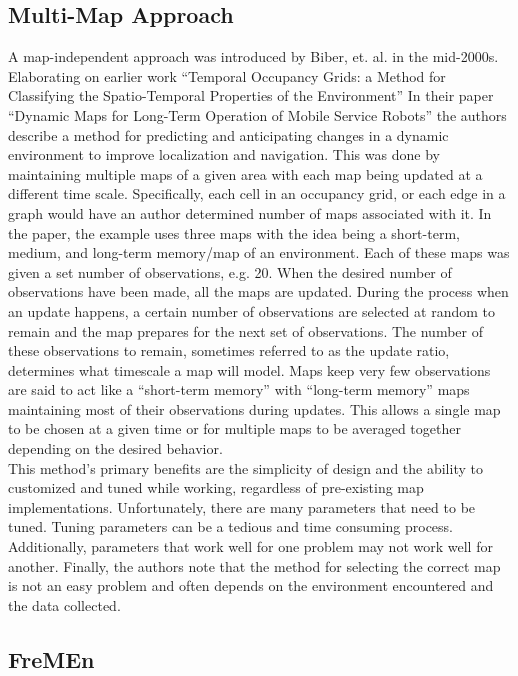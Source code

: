   \subsection{ Multi-Map Approach }
  A map-independent approach was introduced by Biber, et. al. in the mid-2000s.
  Elaborating on earlier work ``Temporal Occupancy Grids: a Method for
  Classifying the Spatio-Temporal Properties of the Environment''
  \cite{Arbuckle2002} In their paper ``Dynamic Maps for Long-Term Operation of Mobile Service Robots''
  the authors describe a method for predicting and anticipating changes in
  a dynamic environment to improve localization and navigation. This was done
  by maintaining multiple maps of a given area with each map
  being updated at a different time scale. Specifically, each cell in an occupancy
  grid, or each edge in a graph would have an author determined number of maps
  associated with it. In the paper, the example uses three maps with the
  idea being a short-term, medium, and long-term memory/map of an environment.
  Each of these maps was given a set number of observations, e.g. 20. When
  the desired number of observations have been made, all the maps are updated. During the process when
  an update happens, a certain number of observations are selected at random to
  remain and the map prepares for the next set of observations. The number of these
  observations to remain, sometimes referred to as the update ratio, determines
  what timescale a map will model. Maps keep very few observations are said to
  act like a ``short-term memory'' with ``long-term memory'' maps maintaining most of
  their observations during updates. This allows a single map to be chosen at a given
  time or for multiple maps to be averaged together depending on the desired behavior. \\

  This method's primary benefits are the simplicity of design and the ability to
  customized and tuned while working, regardless of pre-existing map
  implementations. Unfortunately, there are many parameters that need
  to be tuned. Tuning parameters can be a tedious and time consuming process.
  Additionally, parameters that work well for one problem may not work well for
  another. Finally, the authors note that the method for selecting
  the correct map is not an easy problem and often depends on the environment
  encountered and the data collected. \\


  \subsection{ FreMEn }

